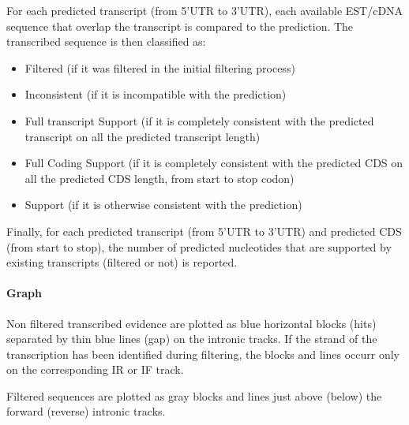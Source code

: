For each predicted transcript (from 5'UTR to 3'UTR), each available
EST/cDNA sequence that overlap the transcript is compared to the
prediction. The transcribed sequence is then  classified as:
\begin{itemize}
\item Filtered (if it was filtered in the initial filtering process)
\item Inconsistent (if it is incompatible with the prediction)
\item Full transcript Support (if it is completely consistent with the
  predicted transcript on all the predicted transcript length)
\item Full Coding Support (if it is completely consistent with the
  predicted CDS on all the predicted CDS length, from start to stop
  codon)
\item Support (if it is otherwise consistent with the prediction)
\end{itemize}

Finally, for each predicted transcript (from 5'UTR to 3'UTR) and
predicted CDS (from start to stop), the number of predicted
nucleotides that are supported by existing transcripts (filtered or
not) is reported.

\paragraph{Graph}

Non filtered transcribed evidence are plotted as blue horizontal
blocks (hits) separated by thin blue lines (gap) on the intronic
tracks. If the strand of the transcription has been identified during
filtering, the blocks and lines occurr only on the corresponding IR or
IF track.

Filtered sequences are plotted as gray blocks and lines just above
(below) the forward (reverse) intronic tracks.

